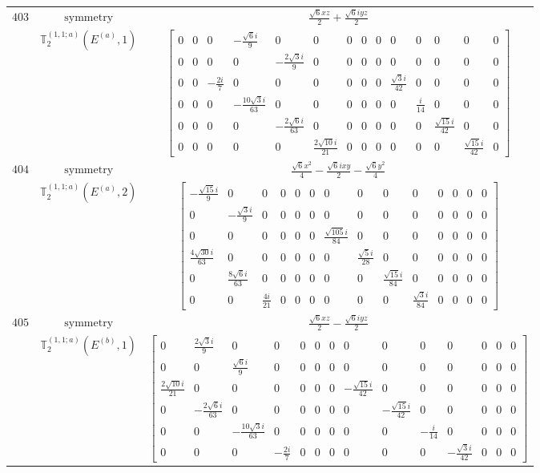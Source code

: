 \documentclass[fleqn,8pt,landscape]{jsarticle}
\begin{document}
\begin{longtable}{ccc}
$ 403 $ & $ \text{symmetry} $ & $ \frac{\sqrt{6} x z}{2} + \frac{\sqrt{6} i y z}{2} $ \\
$  $ & $ \mathbb{T}_{2}^{(1,1;a)}(E^{(a)},1) $ & $ \begin{bmatrix} 0 & 0 & 0 & - \frac{\sqrt{6} i}{9} & 0 & 0 & 0 & 0 & 0 & 0 & 0 & 0 & 0 & 0 \\ 0 & 0 & 0 & 0 & - \frac{2 \sqrt{3} i}{9} & 0 & 0 & 0 & 0 & 0 & 0 & 0 & 0 & 0 \\ 0 & 0 & - \frac{2 i}{7} & 0 & 0 & 0 & 0 & 0 & 0 & \frac{\sqrt{3} i}{42} & 0 & 0 & 0 & 0 \\ 0 & 0 & 0 & - \frac{10 \sqrt{3} i}{63} & 0 & 0 & 0 & 0 & 0 & 0 & \frac{i}{14} & 0 & 0 & 0 \\ 0 & 0 & 0 & 0 & - \frac{2 \sqrt{6} i}{63} & 0 & 0 & 0 & 0 & 0 & 0 & \frac{\sqrt{15} i}{42} & 0 & 0 \\ 0 & 0 & 0 & 0 & 0 & \frac{2 \sqrt{10} i}{21} & 0 & 0 & 0 & 0 & 0 & 0 & \frac{\sqrt{15} i}{42} & 0 \end{bmatrix} $ \\ \hline
$ 404 $ & $ \text{symmetry} $ & $ \frac{\sqrt{6} x^{2}}{4} - \frac{\sqrt{6} i x y}{2} - \frac{\sqrt{6} y^{2}}{4} $ \\
$  $ & $ \mathbb{T}_{2}^{(1,1;a)}(E^{(a)},2) $ & $ \begin{bmatrix} - \frac{\sqrt{15} i}{9} & 0 & 0 & 0 & 0 & 0 & 0 & 0 & 0 & 0 & 0 & 0 & 0 & 0 \\ 0 & - \frac{\sqrt{3} i}{9} & 0 & 0 & 0 & 0 & 0 & 0 & 0 & 0 & 0 & 0 & 0 & 0 \\ 0 & 0 & 0 & 0 & 0 & 0 & \frac{\sqrt{105} i}{84} & 0 & 0 & 0 & 0 & 0 & 0 & 0 \\ \frac{4 \sqrt{30} i}{63} & 0 & 0 & 0 & 0 & 0 & 0 & \frac{\sqrt{5} i}{28} & 0 & 0 & 0 & 0 & 0 & 0 \\ 0 & \frac{8 \sqrt{6} i}{63} & 0 & 0 & 0 & 0 & 0 & 0 & \frac{\sqrt{15} i}{84} & 0 & 0 & 0 & 0 & 0 \\ 0 & 0 & \frac{4 i}{21} & 0 & 0 & 0 & 0 & 0 & 0 & \frac{\sqrt{3} i}{84} & 0 & 0 & 0 & 0 \end{bmatrix} $ \\ \hline
$ 405 $ & $ \text{symmetry} $ & $ \frac{\sqrt{6} x z}{2} - \frac{\sqrt{6} i y z}{2} $ \\
$  $ & $ \mathbb{T}_{2}^{(1,1;a)}(E^{(b)},1) $ & $ \begin{bmatrix} 0 & \frac{2 \sqrt{3} i}{9} & 0 & 0 & 0 & 0 & 0 & 0 & 0 & 0 & 0 & 0 & 0 & 0 \\ 0 & 0 & \frac{\sqrt{6} i}{9} & 0 & 0 & 0 & 0 & 0 & 0 & 0 & 0 & 0 & 0 & 0 \\ \frac{2 \sqrt{10} i}{21} & 0 & 0 & 0 & 0 & 0 & 0 & - \frac{\sqrt{15} i}{42} & 0 & 0 & 0 & 0 & 0 & 0 \\ 0 & - \frac{2 \sqrt{6} i}{63} & 0 & 0 & 0 & 0 & 0 & 0 & - \frac{\sqrt{15} i}{42} & 0 & 0 & 0 & 0 & 0 \\ 0 & 0 & - \frac{10 \sqrt{3} i}{63} & 0 & 0 & 0 & 0 & 0 & 0 & - \frac{i}{14} & 0 & 0 & 0 & 0 \\ 0 & 0 & 0 & - \frac{2 i}{7} & 0 & 0 & 0 & 0 & 0 & 0 & - \frac{\sqrt{3} i}{42} & 0 & 0 & 0 \end{bmatrix} $ \\ \hline

\end{longtable}
\end{document}
